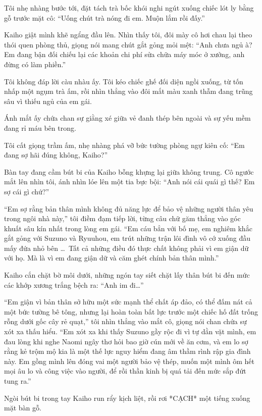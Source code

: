 \documentclass[../main.tex]{subfiles}
\begin{document}
Tôi nhẹ nhàng bước tới, đặt tách trà bốc khói nghi ngút xuống chiếc lót ly bằng gỗ trước mặt cô: ``Uống chút trà nóng đi em. Muộn lắm rồi đấy.''

Kaiho giật mình khẽ ngẩng đầu lên. Nhìn thấy tôi, đôi mày cô hơi chau lại theo thói quen phòng thủ, giọng nói mang chút gắt gỏng mỏi mệt: ``Anh chưa ngủ à? Em đang bận đối chiếu lại các khoản chi phí sửa chữa máy móc ở xưởng, anh đừng có làm phiền.''

Tôi không đáp lời càu nhàu ấy. Tôi kéo chiếc ghế đối diện ngồi xuống, từ tốn nhấp một ngụm trà ấm, rồi nhìn thẳng vào đôi mắt màu xanh thẫm đang trũng sâu vì thiếu ngủ của em gái.

Ánh mắt ấy chứa chan sự giằng xé giữa vẻ đanh thép bên ngoài và sự yếu mềm đang rỉ máu bên trong.

Tôi cất giọng trầm ấm, nhẹ nhàng phá vỡ bức tường phòng ngự kiên cố: ``Em đang sợ hãi đúng không, Kaiho?''

Bàn tay đang cầm bút bi của Kaiho bỗng khựng lại giữa không trung. Cô ngước mắt lên nhìn tôi, ánh nhìn lóe lên một tia bực bội: ``Anh nói cái quái gì thế? Em sợ cái gì chứ?''

``Em sợ rằng bản thân mình không đủ năng lực để bảo vệ những người thân yêu trong ngôi nhà này,'' tôi điềm đạm tiếp lời, từng câu chữ găm thẳng vào góc khuất sâu kín nhất trong lòng em gái. ``Em cáu bẳn với bố mẹ, em nghiêm khắc gắt gỏng với Suzuno và Ryuuhou, em trút những trận lôi đình vô cớ xuống đầu mấy đứa nhỏ bên \hls\dots\ Tất cả những điều đó thực chất không phải vì em giận dữ với họ. Mà là vì em đang giận dữ và căm ghét chính bản thân mình.''

Kaiho cắn chặt bờ môi dưới, những ngón tay siết chặt lấy thân bút bi đến mức các khớp xương trắng bệch ra: ``Anh im đi\dots''

``Em giận vì bản thân sở hữu một sức mạnh thể chất áp đảo, có thể đấm nát cả một bức tường bê tông, nhưng lại hoàn toàn bất lực trước một chiếc hố đất trống rỗng dưới gốc cây rẻ quạt,'' tôi nhìn thẳng vào mắt cô, giọng nói chan chứa sự xót xa thấu hiểu. ``Em xót xa khi thấy Suzuno gầy rộc đi vì tự dằn vặt mình, em đau lòng khi nghe Naomi ngây thơ hỏi bao giờ cún mới về ăn cơm, và em lo sợ rằng kẻ trộm mộ kia là một thế lực nguy hiểm đang âm thầm rình rập gia đình này. Em gồng mình lên đóng vai một người bảo vệ thép, muốn một mình ôm hết mọi âu lo và công việc vào người, để rồi thần kinh bị quá tải đến mức sắp đứt tung ra.''

Ngòi bút bi trong tay Kaiho run rẩy kịch liệt, rồi rơi *CẠCH* một tiếng xuống mặt bàn gỗ.
\end{document}
